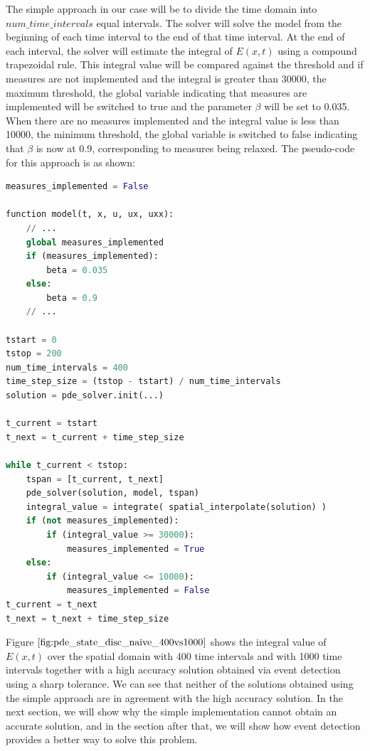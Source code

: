 \documentclass{article}
\begin{document}
The simple approach in our case will be to divide the time domain into $num\_time\_intervals$ equal intervals. The solver will solve the model from the beginning of each time interval to the end of that time interval. At the end of each interval, the solver will estimate the integral of $E(x, t)$ using a compound trapezoidal rule. This integral value will be compared against the threshold and if measures are not implemented and the integral is greater than 30000, the maximum threshold, the global variable indicating that measures are implemented will be switched to true and the parameter $\beta$ will be set to 0.035. When there are no measures implemented and the integral value is less than 10000, the minimum threshold, the global variable is switched to false indicating that $\beta$ is now at 0.9, corresponding to measures being relaxed. The pseudo-code for this approach is as shown:

\begin{minipage}{\linewidth}
\begin{lstlisting}[language=Python]
measures_implemented = False

function model(t, x, u, ux, uxx):
	// ...
	global measures_implemented
	if (measures_implemented):
		beta = 0.035
	else:
		beta = 0.9
	// ...

tstart = 0
tstop = 200
num_time_intervals = 400
time_step_size = (tstop - tstart) / num_time_intervals
solution = pde_solver.init(...)

t_current = tstart
t_next = t_current + time_step_size

while t_current < tstop:
	tspan = [t_current, t_next]
	pde_solver(solution, model, tspan)
	integral_value = integrate( spatial_interpolate(solution) )
	if (not measures_implemented):
		if (integral_value >= 30000): 
			measures_implemented = True
	else:
		if (integral_value <= 10000):
			measures_implemented = False
t_current = t_next
t_next = t_next + time_step_size
\end{lstlisting}
\end{minipage} 

Figure $\ref{fig:pde_state_disc_naive_400vs1000}$ shows the integral value of $E(x, t)$ over the spatial domain with 400 time intervals and with 1000 time intervals together with a high accuracy solution obtained via event detection using a sharp tolerance. We can see that neither of the solutions obtained using the simple approach are in agreement with the high accuracy solution. In the next section, we will show why the simple implementation cannot obtain an accurate solution, and in the section after that, we will show how event detection provides a better way to solve this problem.
\end{document}
